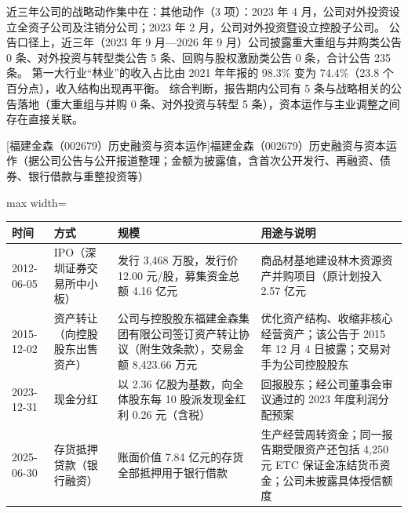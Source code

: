  近三年公司的战略动作集中在：其他动作（3 项）：2023 年 4 月，公司对外投资设立全资子公司及注销分公司；2023 年 2 月，公司对外投资暨设立控股子公司。 公告口径上，近三年（2023 年 9 月---2026 年 9 月）公司披露重大重组与并购类公告 0 条、对外投资与转型类公告 5 条、回购与股权激励类公告 0 条，合计公告 235 条。 第一大行业“林业”的收入占比由 2021 年年报的 98.3\% 变为 74.4\%（23.8 个百分点），收入结构出现再平衡。 综合判断，报告期内公司有 5 条与战略相关的公告落地（重大重组与并购 0 条、对外投资与转型 5 条），资本运作与主业调整之间存在直接关联。

\begin{center}\small\setlength{\tabcolsep}{4pt}
[福建金森（002679）历史融资与资本运作]{福建金森（002679）历史融资与资本运作（据公司公告与公开报道整理；金额为披露值，含首次公开发行、再融资、债券、银行借款与重整投资等）}
\begin{adjustbox}{max width=\textwidth}
\begin{tabular}{@{}p{1.45cm}p{2.55cm}p{4.05cm}p{4.95cm}@{}}
\toprule
时间 & 方式 & 规模 & 用途与说明 \\
\midrule
2012-06-05 & IPO（深圳证券交易所中小板） & 发行 3,\allowbreak{}468 万股，\allowbreak{}发行价 12.00 元/\allowbreak{}股，\allowbreak{}募集资金总额 4.16 亿元 & 商品材基地建设林木资源资产并购项目（原计划投入 2.57 亿元 \\
2015-12-02 & 资产转让（向控股股东出售资产） & 公司与控股股东福建金森集团有限公司签订资产转让协议（附生效条款），\allowbreak{}交易金额 8,\allowbreak{}423.66 万元 & 优化资产结构、\allowbreak{}收缩非核心经营资产；该公告于 2015 年 12 月 4 日披露；交易对手为公司控股股东 \\
2023-12-31 & 现金分红 & 以 2.36 亿股为基数，\allowbreak{}向全体股东每 10 股派发现金红利 0.26 元（含税） & 回报股东；经公司董事会审议通过的 2023 年度利润分配预案 \\
2025-06-30 & 存货抵押贷款（银行融资） & 账面价值 7.84 亿元的存货全部抵押用于银行借款 & 生产经营周转资金；同一报告期受限资产还包括 4,\allowbreak{}250 元 ETC 保证金冻结货币资金；公司未披露具体授信额度 \\
\bottomrule
\end{tabular}
\end{adjustbox}
\end{center}

